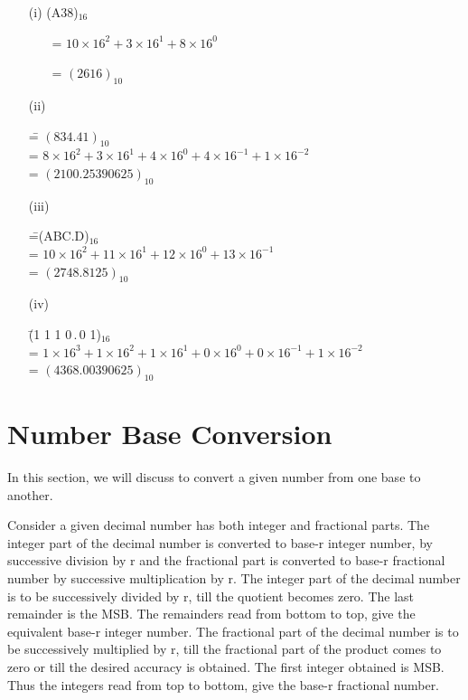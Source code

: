 \begin{solution}
\begin{itemize}
\item[(i)] (A38)$_{16}$

\qquad~~~ = $10\times 16^{2}+3\times 16^{1}+8\times 16^{0}$

\qquad~~~ = $(2616)_{10}$

\item[(ii)]
\begin{tabbing}
\== $(834.41)_{10}$\\[4pt]
\>= $8\times 16^{2}+3\times 16^{1}+4\times 16^{0}+4\times 16^{-1}+1\times 16^{-2}$\\[4pt]
\>= $(2100.25390625)_{10}$
\end{tabbing}

\item[(iii)] 
\begin{tabbing}
\==(ABC.D)$_{16}$\\[4pt]
\>= $10\times 16^{2}+11\times 16^{1}+12\times 16^{0}+13\times 16^{-1}$\\[4pt]
\>= $(2748.8125)_{10}$
\end{tabbing}

\item[(iv)] 
\begin{tabbing}
\=(1 1 1 0\,.\,0 1)$_{16}$\\[4pt]
\>= $1\times 16^{3}+1\times 16^{2}+1\times 16^{1}+0\times 16^{0}+0\times 16^{-1}+1\times 16^{-2}$\\[4pt]
\>= $(4368.00390625)_{10}$
\end{tabbing}
\end{itemize}
\end{solution}

\section{Number Base Conversion}\label{sec5.3}

In this section, we will discuss to convert a given number from one base to another.

\smallskip
{}

Consider a given decimal number has both integer and fractional parts. The integer part of the decimal number is converted to base-r integer number, by successive division by r and the fractional part is converted to base-r fractional number by successive multiplication by r. The integer part of the decimal number is to be successively divided by r, till the quotient becomes zero. The last remainder is the MSB. The remainders read from bottom to top, give the equivalent base-r integer number. The fractional part of the decimal number is to be successively multiplied by r, till the fractional part of the product comes to zero or till the desired accuracy is obtained. The first integer obtained is MSB. Thus the integers read from top to bottom, give the base-r fractional number.

